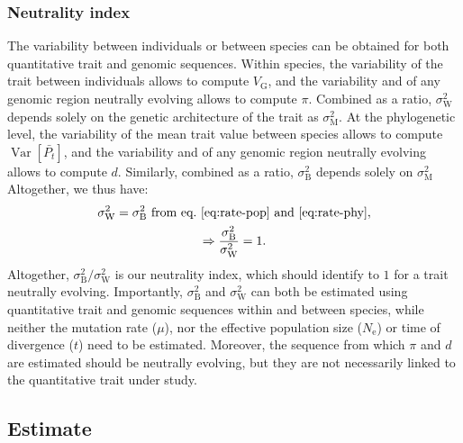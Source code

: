 \documentclass{article}
\DeclareMathOperator{\Var}{\text{Var}}
\newcommand{\Ne}{N_{\text{e}}}
\newcommand{\Time}{t}
\newcommand{\Trait}{P}
\newcommand{\MeanTrait}{\bar{\Trait_{\Time}}}
\newcommand{\VarPhy}{\Var \left[\MeanTrait\right]}
\newcommand{\MutationRate}{\mu}
\newcommand{\VarGenetic}{V_{\mathrm{G}}}
\newcommand{\RateMut}{\sigma^2_{\mathrm{M}}}
\newcommand{\RateBetween}{\sigma^2_{\mathrm{B}}}
\newcommand{\RateWhithin}{\sigma^2_{\mathrm{W}}}
\begin{document}
\subsubsection*{Neutrality index}

The variability between individuals or between species can be obtained for both quantitative trait and genomic sequences.
Within species, the variability of the trait between individuals allows to compute $\VarGenetic$, and the variability and of any genomic region neutrally evolving allows to compute $\pi$.
Combined as a ratio, $\RateWhithin$ depends solely on the genetic architecture of the trait as $\RateMut$.
At the phylogenetic level, the variability of the mean trait value between species allows to compute $\VarPhy$, and the variability and of any genomic region neutrally evolving allows to compute $d$.
Similarly, combined as a ratio, $\RateBetween$ depends solely on $\RateMut$
Altogether, we thus have:
\begin{gather}
    \RateWhithin = \RateBetween \text{ from eq.~\ref{eq:rate-pop} and~\ref{eq:rate-phy}}, \\
    \Rightarrow \frac{\RateBetween}{\RateWhithin} = 1.
\end{gather}
Altogether, $\RateBetween / \RateWhithin$ is our neutrality index, which should identify to $1$ for a trait neutrally evolving.
Importantly, $\RateBetween$ and $\RateWhithin$ can both be estimated using quantitative trait and genomic sequences within and between species, while neither the mutation rate ($\MutationRate$), nor the effective population size ($\Ne$) or time of divergence ($\Time$) need to be estimated.
Moreover, the sequence from which $\pi$ and $d$ are estimated should be neutrally evolving, but they are not necessarily linked to the quantitative trait under study.

\subsection*{Estimate}\label{subsec:estimate}
\end{document}
